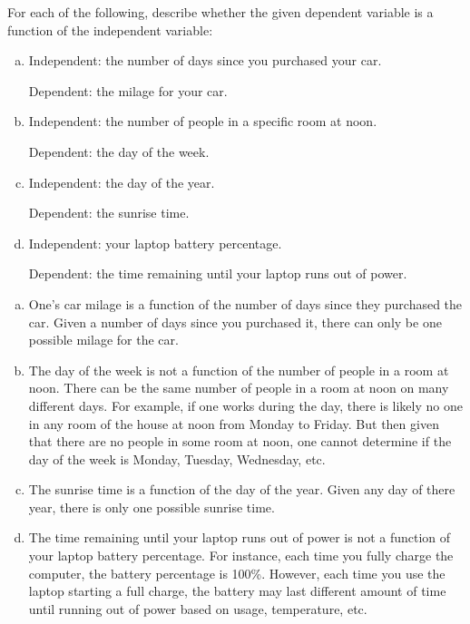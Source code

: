 \documentclass[11pt,letterpaper]{article}
\begin{document}

 For each of the following, describe whether the given dependent variable is a function of the independent variable:
	\begin{enumerate}[(a)]
	\item Independent: the number of days since you purchased your car. \par 
		Dependent: the milage for your car. 
	\item Independent: the number of people in a specific room at noon. \par 
		Dependent: the day of the week.
	\item Independent: the day of the year. \par
		Dependent: the sunrise time. 
	\item Independent: your laptop battery percentage. \par
		Dependent: the time remaining until your laptop runs out of power. 
	\end{enumerate} \pspace

\sol 
\begin{enumerate}[(a)]
\item One's car milage is a function of the number of days since they purchased the car. Given a number of days since you purchased it, there can only be one possible milage for the car. \pspace

\item The day of the week is not a function of the number of people in a room at noon. There can be the same number of people in a room at noon on many different days. For example, if one works during the day, there is likely no one in any room of the house at noon from Monday to Friday. But then given that there are no people in some room at noon, one cannot determine if the day of the week is Monday, Tuesday, Wednesday, etc. \pspace

\item The sunrise time is a function of the day of the year. Given any day of there year, there is only one possible sunrise time. \pspace

\item The time remaining until your laptop runs out of power is not a function of your laptop battery percentage. For instance, each time you fully charge the computer, the battery percentage is 100\%. However, each time you use the laptop starting a full charge, the battery may last different amount of time until running out of power based on usage, temperature, etc. 
\end{enumerate}
\end{document}
